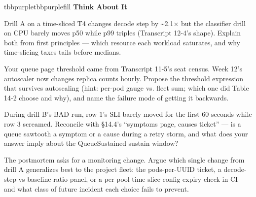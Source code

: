 \begin{calloutbox}{tbbpurple}{tbbpurplefill}
{\normalsize\bfseries\color{tbbpurple}Think About It}\par\vspace{3pt}
\begin{tbbitemize}
  \item Drill A on a time-sliced T4 changes decode step by \textasciitilde{}2.1× but the classifier drill on CPU barely moves p50 while p99 triples (Transcript 12-4’s shape). Explain both from first principles — which resource each workload saturates, and why time-slicing taxes tails before medians.
  \item Your queue page threshold came from Transcript 11-5’s seat census. Week 12’s autoscaler now changes replica counts hourly. Propose the threshold expression that survives autoscaling (hint: per-pod gauge vs. fleet sum; which one did Table 14-2 choose and why), and name the failure mode of getting it backwards.
  \item During drill B’s BAD run, row 1’s SLI barely moved for the first 60 seconds while row 3 screamed. Reconcile with §14.4’s “symptoms page, causes ticket” — is a queue sawtooth a symptom or a cause during a retry storm, and what does your answer imply about the QueueSustained sustain window?
  \item The postmortem asks for a monitoring change. Argue which single change from drill A generalizes best to the project fleet: the pods-per-UUID ticket, a decode-step-vs-baseline ratio panel, or a per-pool time-slice-config expiry check in CI — and what class of future incident each choice fails to prevent.
\end{tbbitemize}
\end{calloutbox}




